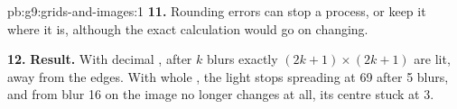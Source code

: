 \begin{solution}{pb:g9:grids-and-images:1}
\textbf{11.} Rounding errors can stop a process, or keep it where it is,
although the exact calculation would go on changing.

\textbf{12.} \textbf{Result.} With decimal , after $k$ blurs exactly
$(2k + 1) \times (2k + 1)$  are lit, away from the edges. With whole , the light stops spreading at 69  after 5 blurs, and from blur 16
on the image no longer changes at all, its centre stuck at 3.
\end{solution}
